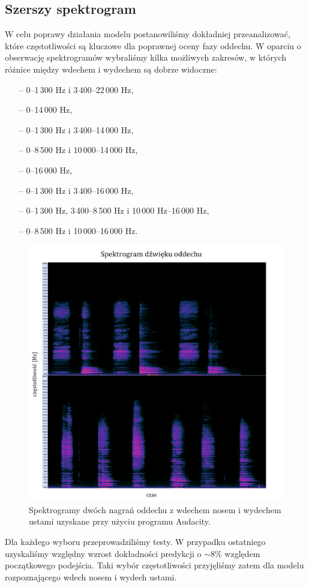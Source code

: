 \documentclass[polish]{article}
\begin{document}
\subsection{Szerszy spektrogram}
W celu poprawy działania modelu postanowiliśmy dokładniej przeanalizować, które częstotliwości są kluczowe dla poprawnej oceny fazy oddechu. W oparciu o obserwację spektrogramów wybraliśmy kilka możliwych zakresów, w których różnice między wdechem i wydechem są dobrze widoczne:
\begin{itemize}
	\setlength\itemsep{-0.25em}
	\item[--] 0--1\,300 \unit{Hz} i 3\,400--22\,000 \unit{Hz},
	\item[--] 0--14\,000 \unit{Hz},
	\item[--] 0--1\,300 \unit{Hz} i 3\,400--14\,000 \unit{Hz},
	\item[--] 0--8\,500 \unit{Hz} i 10\,000--14\,000 \unit{Hz},
	\item[--] 0--16\,000 \unit{Hz},
	\item[--] 0--1\,300 \unit{Hz} i 3\,400--16\,000 \unit{Hz},
	\item[--] 0--1\,300 \unit{Hz}, 3\,400--8\,500 \unit{Hz} i 10\,000 \unit{Hz}--16\,000 \unit{Hz},
	\item[--] 0--8\,500 \unit{Hz} i 10\,000--16\,000 \unit{Hz}.
\end{itemize}
\begin{figure}[H]
	\centering
	\includegraphics[width=13cm]{spektrogram_wydech_ustami}
	\caption{Spektrogramy dwóch nagrań oddechu z wdechem nosem i wydechem ustami uzyskane przy użyciu programu Audacity.}
\end{figure}
Dla każdego wyboru przeprowadziliśmy testy. W przypadku ostatniego uzyskaliśmy względny wzrost dokładności predykcji o $\sim8\%$ względem początkowego podejścia. Taki wybór częstotliwości przyjęliśmy zatem dla modelu rozpoznającego wdech nosem i wydech ustami.
\end{document}
